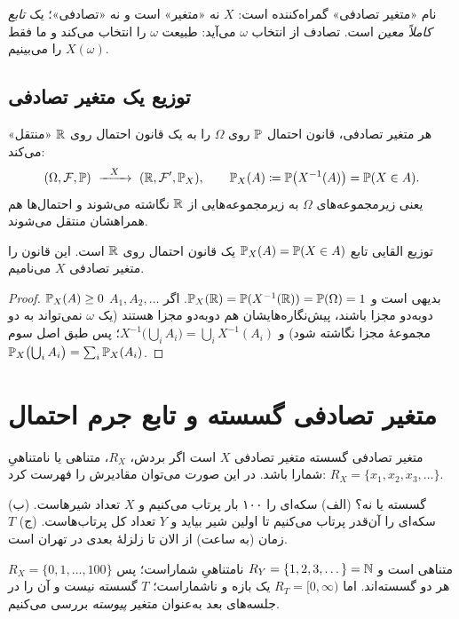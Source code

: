 \begin{warning}
نام «متغیر تصادفی» گمراه‌کننده است: $X$ نه «متغیر» است و نه «تصادفی»؛ یک \emph{تابع کاملاً معین} است. تصادف از انتخاب $\omega$ می‌آید: طبیعت $\omega$ را انتخاب می‌کند و ما فقط $X(\omega)$ را می‌بینیم.
\end{warning}

\subsection{توزیع یک متغیر تصادفی}

هر متغیر تصادفی، قانون احتمال $\P$ روی $\Omega$ را به یک قانون احتمال روی $\R$ «منتقل» می‌کند:
\[ (\Omega,\F,\P)\ \xrightarrow{\ \ X\ \ }\ (\R,\F',\P_X),\qquad \P_X(A)\defeq\P\bigl(X^{-1}(A)\bigr)=\P(X\in A). \]
یعنی زیرمجموعه‌های $\Omega$ به زیرمجموعه‌هایی از $\R$ نگاشته می‌شوند و احتمال‌ها هم همراهشان منتقل می‌شوند.

\begin{proposition}[label=prop:induced]{توزیع القایی}
تابع $\P_X(A)=\P(X\in A)$ یک قانون احتمال روی $\R$ است. این قانون را  متغیر تصادفی $X$ می‌نامیم.
\end{proposition}

\begin{proof}
$\P_X(A)\ge0$ بدیهی است و $\P_X(\R)=\P(X^{-1}(\R))=\P(\Omega)=1$. اگر $A_1,A_2,\dots$ دوبه‌دو مجزا باشند، پیش‌نگاره‌هایشان هم دوبه‌دو مجزا هستند (یک $\omega$ نمی‌تواند به دو مجموعهٔ مجزا نگاشته شود) و $X^{-1}\bigl(\bigcup_iA_i\bigr)=\bigcup_iX^{-1}(A_i)$؛ پس طبق اصل سوم $\P_X\bigl(\bigcup_iA_i\bigr)=\sum_i\P_X(A_i)$.
\end{proof}



\section{متغیر تصادفی گسسته و تابع جرم احتمال}

\begin{definition}[label=def:discrete-rv]{متغیر تصادفی گسسته}
متغیر تصادفی $X$  است اگر بردش، $R_X$، متناهی یا نامتناهیِ شمارا باشد. در این صورت می‌توان مقادیرش را فهرست کرد: $R_X=\{x_1,x_2,x_3,\dots\}$.
\end{definition}

\begin{example}{گسسته یا نه؟}
(الف) سکه‌ای را ۱۰۰ بار پرتاب می‌کنیم و $X$ تعداد شیرهاست. (ب) سکه‌ای را آن‌قدر پرتاب می‌کنیم تا اولین شیر بیاید و $Y$ تعداد کل پرتاب‌هاست. (ج) $T$ زمان (به ساعت) از الان تا زلزلهٔ بعدی در تهران است.
\begin{solution}
$R_X=\{0,1,\dots,100\}$ متناهی است و $R_Y=\{1,2,3,\dots\}=\N$ نامتناهیِ شماراست؛ پس هر دو گسسته‌اند. اما $R_T=[0,\infty)$ یک بازه و ناشماراست؛ $T$ گسسته نیست و آن را در جلسه‌های بعد به‌عنوان متغیر \emph{پیوسته} بررسی می‌کنیم.
\end{solution}
\end{example}

